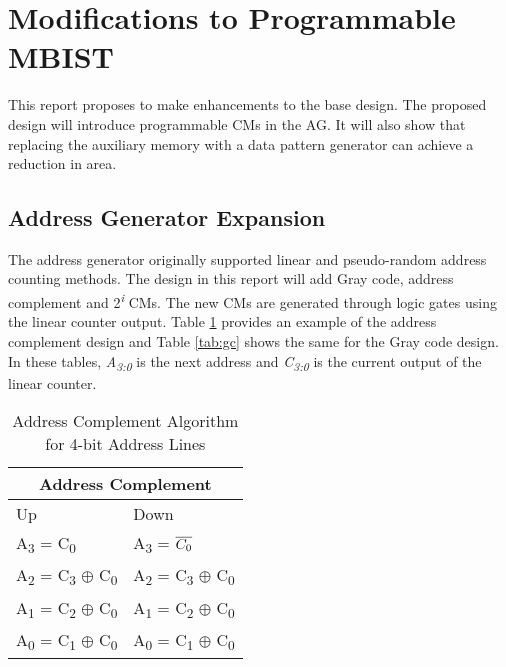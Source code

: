 \section{Modifications to Programmable MBIST}
\label{sect:bg-modifications}
This report proposes to make enhancements to the base design.  The proposed design will introduce programmable CMs in the AG.  It will also show that replacing the auxiliary memory with a data pattern generator can achieve a reduction in area.

\subsection{Address Generator Expansion}
The address generator originally supported linear and pseudo-random address counting methods.  The design in this report will add Gray code, address complement and 2\textsuperscript{\textit{i}} CMs.  The new CMs are generated through logic gates using the linear counter output.  Table \ref{tab:ac} provides an example of the address complement design and Table \ref{tab:gc} shows the same for the Gray code design.  In these tables, \textit{A\textsubscript{3:0}} is the next address and \textit{C\textsubscript{3:0}} is the current output of the linear counter.

\begin{table}[H]
  \centering
  \caption[Address Complement CM Algorithm]{Address Complement Algorithm for 4-bit Address Lines}
  \begin{tabular}{|l|l|}
    \hline
    \multicolumn{2}{|c|}{Address Complement} \\
    \hline  
    Up  & Down  \\                                                          
    \hline
    A\textsubscript{3} = C\textsubscript{0}                           & A\textsubscript{3} = $\overline{C\textsubscript{0}}$              \\ %
    A\textsubscript{2} = C\textsubscript{3} $\oplus$ C\textsubscript{0} & A\textsubscript{2} = C\textsubscript{3} $\oplus$ C\textsubscript{0} \\ %
    A\textsubscript{1} = C\textsubscript{2} $\oplus$ C\textsubscript{0} & A\textsubscript{1} = C\textsubscript{2} $\oplus$ C\textsubscript{0} \\ %
    A\textsubscript{0} = C\textsubscript{1} $\oplus$ C\textsubscript{0} & A\textsubscript{0} = C\textsubscript{1} $\oplus$ C\textsubscript{0} \\ %
    \hline
  \end{tabular} 
  \label{tab:ac}
\end{table}

